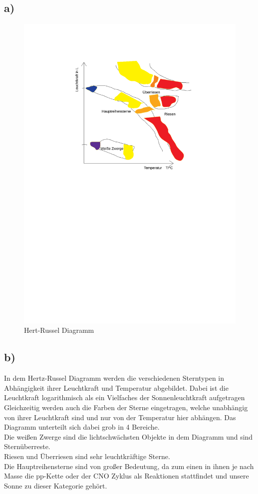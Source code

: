 \subsection{a)}
\begin{figure}[H]
    \centering
    \includegraphics[width=\linewidth]{images/hertz_russel.pdf}
    \caption{Hert-Russel Diagramm}
\end{figure}

\subsection{b)}
In dem Hertz-Russel Diagramm werden die verschiedenen Sterntypen
in Abhängigkeit ihrer Leuchtkraft und Temperatur abgebildet.
Dabei ist die Leuchtkraft logarithmisch als ein Vielfaches der
Sonnenleuchtkraft aufgetragen
Gleichzeitig werden auch die Farben der Sterne eingetragen, welche unabhängig
von ihrer Leuchtkraft sind und nur von der Temperatur hier abhängen.
Das Diagramm unterteilt sich dabei grob in 4 Bereiche.\\
Die weißen Zwerge sind die lichtschwächsten Objekte in dem Diagramm und sind Sternüberreste.\\
Riesen und Überriesen sind sehr leuchtkräftige Sterne.\\
Die Hauptreihensterne sind von großer Bedeutung, da zum einen in ihnen je nach Masse 
die pp-Kette oder der CNO Zyklus als Reaktionen stattfindet und unsere Sonne zu dieser Kategorie gehört.


